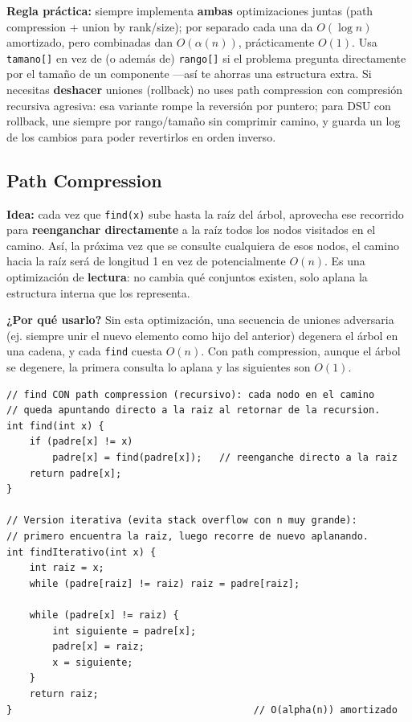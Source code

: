 \documentclass[10pt,a4paper,twocolumn]{article}
\begin{document}
\textbf{Regla práctica:} siempre implementa \textbf{ambas}
optimizaciones juntas (path compression + union by rank/size); por
separado cada una da $O(\log n)$ amortizado, pero combinadas dan
$O(\alpha(n))$, prácticamente $O(1)$. Usa \texttt{tamano[]} en vez de
(o además de) \texttt{rango[]} si el problema pregunta directamente
por el tamaño de un componente —así te ahorras una estructura
extra. Si necesitas \textbf{deshacer} uniones (rollback) no uses path
compression con compresión recursiva agresiva: esa variante rompe la
reversión por puntero; para DSU con rollback, une siempre por
rango/tamaño sin comprimir camino, y guarda un log de los cambios
para poder revertirlos en orden inverso.


\subsection{Path Compression}

\textbf{Idea:} cada vez que \texttt{find(x)} sube hasta la raíz del
árbol, aprovecha ese recorrido para \textbf{reenganchar directamente}
a la raíz todos los nodos visitados en el camino. Así, la próxima vez
que se consulte cualquiera de esos nodos, el camino hacia la raíz
será de longitud 1 en vez de potencialmente $O(n)$. Es una
optimización de \textbf{lectura}: no cambia qué conjuntos existen,
solo aplana la estructura interna que los representa.

\textbf{¿Por qué usarlo?} Sin esta optimización, una secuencia de
uniones adversaria (ej. siempre unir el nuevo elemento como hijo del
anterior) degenera el árbol en una cadena, y cada \texttt{find}
cuesta $O(n)$. Con path compression, aunque el árbol se degenere,
la primera consulta lo aplana y las siguientes son $O(1)$.

\begin{lstlisting}[style=cpp]
// find CON path compression (recursivo): cada nodo en el camino
// queda apuntando directo a la raiz al retornar de la recursion.
int find(int x) {
    if (padre[x] != x)
        padre[x] = find(padre[x]);   // reenganche directo a la raiz
    return padre[x];
}

// Version iterativa (evita stack overflow con n muy grande):
// primero encuentra la raiz, luego recorre de nuevo aplanando.
int findIterativo(int x) {
    int raiz = x;
    while (padre[raiz] != raiz) raiz = padre[raiz];

    while (padre[x] != raiz) {
        int siguiente = padre[x];
        padre[x] = raiz;
        x = siguiente;
    }
    return raiz;
}                                          // O(alpha(n)) amortizado
\end{lstlisting}
\end{document}
